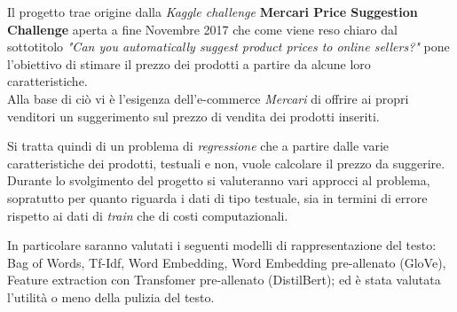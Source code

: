 



Il progetto trae origine dalla \textit{Kaggle challenge} \textbf{Mercari Price
Suggestion Challenge}\cite{mercari-price-suggestion-challenge} aperta a fine
Novembre 2017 che come viene reso chiaro dal sottotitolo \textit{"Can you
automatically suggest product prices to online sellers?"} pone l'obiettivo di
stimare il prezzo dei prodotti a partire da alcune loro caratteristiche. \\
Alla base di ciò vi è l'esigenza dell'e-commerce \textit{Mercari}\cite{mercari}
di offrire ai propri venditori un suggerimento sul prezzo di vendita dei
prodotti inseriti.

Si tratta quindi di un problema di \textit{regressione} che a partire dalle
varie caratteristiche dei prodotti, testuali e non, vuole calcolare il prezzo da
suggerire.
\\
Durante lo svolgimento del progetto si valuteranno vari approcci al problema,
sopratutto per quanto riguarda i dati di tipo testuale, sia in termini di errore
rispetto ai dati di \textit{train} che di costi computazionali.

In particolare saranno valutati i seguenti modelli di rappresentazione del
testo: Bag of Words, Tf-Idf, Word Embedding, Word Embedding pre-allenato (GloVe),
Feature extraction con Transfomer pre-allenato (DistilBert); ed è stata valutata l'utilità o meno della pulizia del testo.

